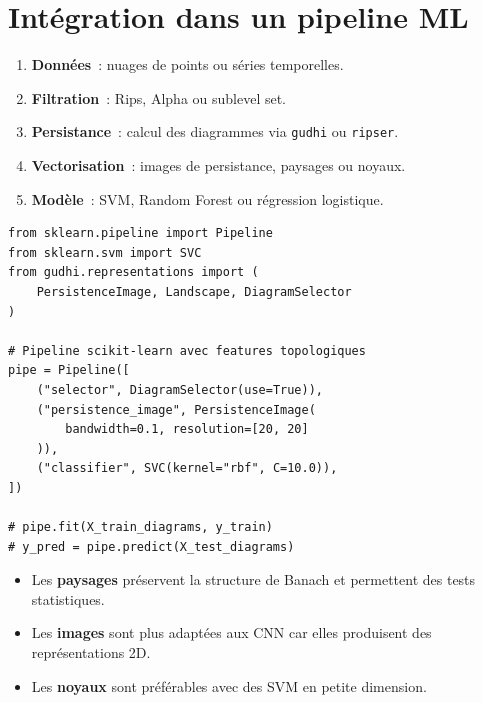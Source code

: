 \section{Int\'egration dans un pipeline ML}
\label{sec:pipeline}

\begin{exemple}
\begin{enumerate}
  \item \textbf{Donn\'ees}~: nuages de points ou s\'eries temporelles.
  \item \textbf{Filtration}~: Rips, Alpha ou sublevel set.
  \item \textbf{Persistance}~: calcul des diagrammes via \texttt{gudhi}
        ou \texttt{ripser}.
  \item \textbf{Vectorisation}~: images de persistance, paysages ou noyaux.
  \item \textbf{Mod\`ele}~: SVM, Random Forest ou r\'egression logistique.
\end{enumerate}
\end{exemple}

\begin{verbatim}
from sklearn.pipeline import Pipeline
from sklearn.svm import SVC
from gudhi.representations import (
    PersistenceImage, Landscape, DiagramSelector
)

# Pipeline scikit-learn avec features topologiques
pipe = Pipeline([
    ("selector", DiagramSelector(use=True)),
    ("persistence_image", PersistenceImage(
        bandwidth=0.1, resolution=[20, 20]
    )),
    ("classifier", SVC(kernel="rbf", C=10.0)),
])

# pipe.fit(X_train_diagrams, y_train)
# y_pred = pipe.predict(X_test_diagrams)
\end{verbatim}

\begin{attention}[title=\textbf{Choix de la vectorisation}]
\begin{itemize}
  \item Les \textbf{paysages} pr\'eservent la structure de Banach et
        permettent des tests statistiques.
  \item Les \textbf{images} sont plus adapt\'ees aux CNN car elles
        produisent des repr\'esentations 2D.
  \item Les \textbf{noyaux} sont pr\'ef\'erables avec des SVM en
        petite dimension.
\end{itemize}
\end{attention}

